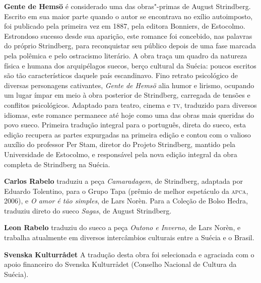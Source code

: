 \textbf{Gente de Hemsö} é considerado uma das obras"-primas de August Strindberg. 
Escrito em sua maior parte quando o autor se encontrava no exílio autoimposto, 
foi publicado pela primeira vez em 1887, pela editora Bonniers, de Estocolmo.  
Estrondoso sucesso desde sua aparição, este romance foi concebido, nas palavras do próprio 
Strindberg, para reconquistar seu público depois de uma fase marcada pela polêmica e pelo 
ostracismo literário.  A obra traça um quadro da natureza física e humana dos arquipélagos suecos, 
berço cultural da Suécia: poucos escritos são tão característicos daquele país 
escandinavo. Fino retrato psicológico de diversas personagens cativantes,  
\textit{Gente de Hemsö} alia humor e lirismo, ocupando um lugar ímpar 
em meio à obra posterior de Strindberg, carregada de tensões e conflitos 
psicológicos.  Adaptado para teatro, cinema e \textsc{tv}, traduzido para diversos idiomas, 
este romance permanece até hoje como uma das obras mais queridas do povo sueco. 
Primeira tradução integral para o português, direta do sueco, esta edição recupera as partes 
expurgadas na primeira edição e contou com o valioso auxílio do professor Per Stam, 
diretor do Projeto Strindberg, mantido pela Universidade de Estocolmo, e responsável pela nova 
edição integral da obra completa de Strindberg na Suécia. 

\textbf{Carlos Rabelo} traduziu a peça \textit{Camaradagem},
de Strindberg, adaptada por Eduardo Tolentino, para o Grupo Tapa (prêmio de
melhor espetáculo da \textsc{apca}, 2006), e \textit{O amor é tão simples}, de
Lars Norèn. Para a Coleção de Bolso Hedra, traduziu direto do sueco
\textit{Sagas}, de August Strindberg.

\textbf{Leon Rabelo} traduziu do sueco a peça \textit{Outono e Inverno}, de Lars Norèn, 
e trabalha atualmente em diversos intercâmbios culturais entre a Suécia e o Brasil.

\textbf{Svenska Kulturrådet} A tradução desta obra foi selecionada e agraciada com o apoio financeiro do Svenska Kulturrådet 
(Conselho Nacional de Cultura da Suécia).



